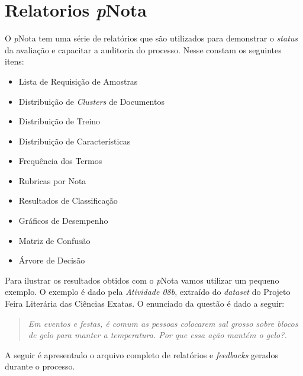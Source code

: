 %
%
\chapter{Relatorios \textit{p}Nota}
\label{exemplo-pNota}

O \textit{p}Nota tem uma série de relatórios que são utilizados para demonstrar o \textit{status} da avaliação e capacitar a auditoria do processo. Nesse constam os seguintes itens:

\begin{itemize}
\item Lista de Requisição de Amostras
\item Distribuição de \textit{Clusters} de Documentos
\item Distribuição de Treino
\item Distribuição de Características
\item Frequência dos Termos
\item Rubricas por Nota
\item Resultados de Classificação
\item Gráficos de Desempenho
\item Matriz de Confusão
\item Árvore de Decisão
\end{itemize}

Para ilustrar os resultados obtidos com o \textit{p}Nota vamos utilizar um pequeno exemplo. O exemplo é dado pela \textit{Atividade 08b}, extraído do \textit{dataset} do Projeto Feira Literária das Ciências Exatas. O enunciado da questão é dado a seguir:

\begin{quote}
\textit{Em eventos e festas, é comum as pessoas colocarem sal grosso sobre blocos de gelo para manter a temperatura. Por que essa ação mantém o gelo?.}
\end{quote}

A seguir é apresentado o arquivo completo de relatórios e \textit{feedbacks} gerados durante o processo.

